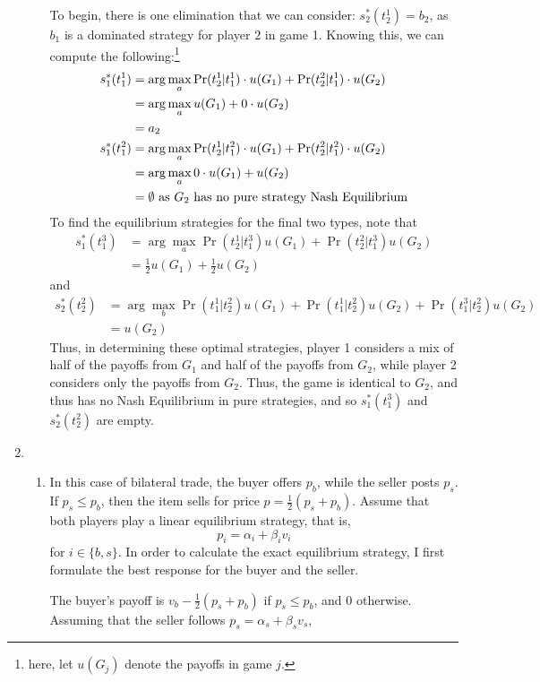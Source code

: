 \documentclass[11pt]{article}
\begin{document}
\begin{enumerate}
\begin{enumerate}
		To begin, there is one elimination that we can consider: $ s_2^*(t_2^1) = b_2 $, as $ b_1 $ is a dominated strategy for player $ 2 $ in game 1. Knowing this, we can compute the following:\footnote{here, let $ u(G_j) $ denote the payoffs in game $ j $. }
		\begin{align*}
		s_1^*(t_1^1) &= \arg\max_a \Pr(t_2^1 | t_1^1)\cdot u(G_1) + \Pr(t_2^2 | t_1^1)\cdot u(G_2) \\
		&= \arg\max_a  u(G_1) + 0\cdot u(G_2) \\
		&= a_2 \\
		s_1^*(t_1^2) &= \arg\max_a \Pr(t_2^1 | t_1^2)\cdot u(G_1) + \Pr(t_2^2 | t_1^2)\cdot u(G_2) \\
		&= \arg\max_a 0\cdot u(G_1) + u(G_2) \\
		&= \emptyset\text{ as $ G_2 $ has no pure strategy Nash Equilibrium}
		\end{align*}
		To find the equilibrium strategies for the final two types, note that 
		\begin{align*}
		s_1^*(t_1^3) &= \arg\max_a \Pr(t_2^1 | t_1^3)u(G_1) + \Pr(t_2^2 | t_1^3)u(G_2) \\
		&= \frac{1}{2}u(G_1) + \frac{1}{2}u(G_2)
		\end{align*}
		and
		\begin{align*}
		s_2^*(t_2^2) &= \arg\max_b \Pr(t_1^1 | t_2^2)u(G_1) + \Pr(t_1^1 | t_2^2)u(G_2) + \Pr(t_1^3|t_2^2)u(G_2) \\
		&= u(G_2)
		\end{align*}
		Thus, in determining these optimal strategies, player 1 considers a mix of half of the payoffs from $ G_1 $ and half of the payoffs from $ G_2 $, while player 2 considers only the payoffs from $ G_2 $. Thus, the game is identical to $ G_2 $, and thus has no Nash Equilibrium in pure strategies, and so  $ s_1^*(t_1^3) $ and $ s_2^*(t_2^2) $ are empty. 
	\end{enumerate}
	\item 
	\begin{enumerate}
		\item In this case of bilateral trade, the buyer offers $ p_b $, while the seller posts $ p_s $. If $ p_s \leq p_b $, then the item sells for price $ p = \frac{1}{2}(p_s + p_b) $. Assume that both players play a linear equilibrium strategy, that is,
		\[p_i = \alpha_i + \beta_i v_i\]
		for $ i\in\{b, s\} $. In order to calculate the exact equilibrium strategy, I first formulate the best response for the buyer and the seller.
		
		The buyer's payoff is $ v_b - \frac{1}{2}(p_s + p_b) $ if $ p_s \leq p_b $, and 0 otherwise. Assuming that the seller follows $ p_s = \alpha_s + \beta_s v_s $, 
		

\end{enumerate}
\end{enumerate}
\end{document}
